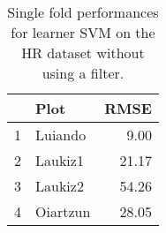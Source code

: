 \begin{table}[ht!]
\centering
\caption{Single fold performances for learner SVM on the HR dataset without using a filter.} 
\label{tab:svm-single-fold-perf}
\begin{tabular}{rlr}
  \hline
 & Plot & RMSE \\ 
  \hline
1 & Luiando & 9.00 \\ 
  2 & Laukiz1 & 21.17 \\ 
  3 & Laukiz2 & 54.26 \\ 
  4 & Oiartzun & 28.05 \\ 
   \hline
\end{tabular}
\end{table}
